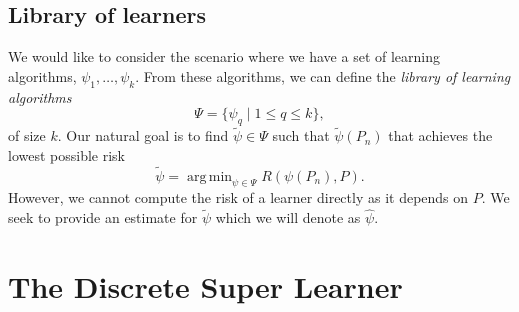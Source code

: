 \documentclass[11pt, a4paper]{article}
\theoremstyle{definition}
\theoremstyle{remark}
\DeclareMathOperator*{\argmin}{arg\,min}
\newcommand{\q}{q}
\newcommand{\ml}{k}
\newcommand{\btheta}{\theta}
\newcommand{\la}{\psi}
\newcommand{\lib}{\Psi}
\begin{document}


\subsection{Library of learners}
We would like to consider the scenario where we have a set of learning algorithms, $ \la_1, \ldots, \la_\ml $. From these algorithms, we can define the \textit{library of learning algorithms} 
$$ \lib = \{\la_{\q} \mid 1 \leq \q \leq \ml \}, $$
of size $ \ml $. Our natural goal is to find $ \tilde{\la} \in \lib $ such that $ \tilde{\la}(P_n) $ that achieves the lowest possible risk 
$$ \tilde{\la}  = \argmin_{\la \in \lib} R(\la(P_n) , P). $$
However, we cannot compute the risk of a learner directly as it depends on $ P $. We seek to provide an estimate for $ \tilde{\la} $ which we will denote as $ \hat{\la} $. 

\section{The Discrete Super Learner}
\end{document}
